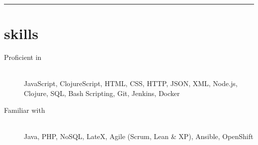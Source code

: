 \begin{samepage}
  \hrule
  \section*{skills}
\end{samepage}


\begin{description}
\item[Proficient in] \hfill \\ JavaScript, ClojureScript, HTML, CSS, HTTP, JSON,
  XML, Node.js, Clojure, SQL, Bash Scripting, Git, Jenkins, Docker
\item[Familiar with] \hfill \\ Java, PHP, NoSQL, LateX, Agile (Scrum, Lean \&
  XP), Ansible, OpenShift
\end{description}
